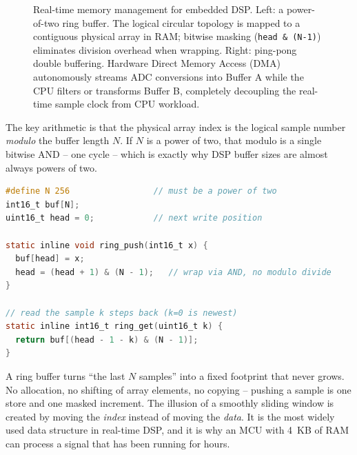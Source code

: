 \begin{figure}[H]
\caption{Real-time memory management for embedded DSP. Left: a power-of-two ring buffer. The logical circular topology is mapped to a contiguous physical array in RAM; bitwise masking (\texttt{head \& (N-1)}) eliminates division overhead when wrapping. Right: ping-pong double buffering. Hardware Direct Memory Access (DMA) autonomously streams ADC conversions into Buffer A while the CPU filters or transforms Buffer B, completely decoupling the real-time sample clock from CPU workload.}
\label{ch40:fig-ring}
\end{figure}

The key arithmetic is that the physical array index is the logical sample number \emph{modulo} the
buffer length $N$. If $N$ is a power of two, that modulo is a single bitwise AND -- one cycle --
which is exactly why DSP buffer sizes are almost always powers of two.

\begin{lstlisting}[language=C, caption={A power-of-two ring buffer with a single-cycle wrap.}]
#define N 256                 // must be a power of two
int16_t buf[N];
uint16_t head = 0;            // next write position

static inline void ring_push(int16_t x) {
  buf[head] = x;
  head = (head + 1) & (N - 1);   // wrap via AND, no modulo divide
}

// read the sample k steps back (k=0 is newest)
static inline int16_t ring_get(uint16_t k) {
  return buf[(head - 1 - k) & (N - 1)];
}
\end{lstlisting}

\begin{happeningbox}
A ring buffer turns ``the last $N$ samples'' into a fixed footprint that never grows. No
allocation, no shifting of array elements, no copying -- pushing a sample is one store and one
masked increment. The illusion of a smoothly sliding window is created by moving the \emph{index}
instead of moving the \emph{data}. It is the most widely used data structure in real-time
DSP, and it is why an MCU with 4~KB of RAM can process a signal that has been running for hours.
\end{happeningbox}

